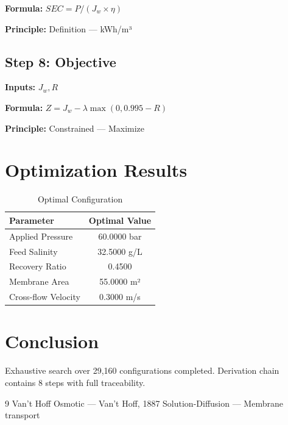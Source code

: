 \documentclass[11pt,twocolumn]{article}
\begin{document}
\textbf{Formula:} $SEC = P/(J_w \times \eta)$

\textbf{Principle:} Definition --- kWh/m³

\subsection*{Step 8: Objective}
\textbf{Inputs:} $J_w, R$

\textbf{Formula:} $Z = J_w - \lambda\max(0, 0.995-R)$

\textbf{Principle:} Constrained --- Maximize


\section{Optimization Results}
\begin{table}[h]
\centering
\caption{Optimal Configuration}
\begin{tabular}{@{}lc@{}}
\toprule
Parameter & Optimal Value \\
\midrule
Applied Pressure & 60.0000 bar \\
Feed Salinity & 32.5000 g/L \\
Recovery Ratio & 0.4500  \\
Membrane Area & 55.0000 m² \\
Cross-flow Velocity & 0.3000 m/s \\
\bottomrule
\end{tabular}
\end{table}

\section{Conclusion}
Exhaustive search over 29,160 configurations completed.
Derivation chain contains 8 steps with full traceability.

\begin{thebibliography}{9}
 Van't Hoff Osmotic --- Van't Hoff, 1887
 Solution-Diffusion --- Membrane transport
\end{thebibliography}
\end{document}
